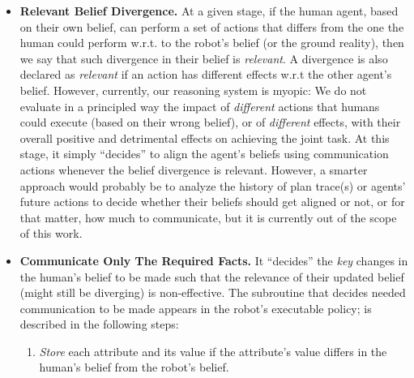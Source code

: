 \documentclass[letterpaper]{article} %
\begin{document}


\begin{itemize}
    \item \textbf{Relevant Belief Divergence.}
    At a given stage, if the human agent, based on their own belief, can perform a set of actions that differs from 
    the one 
    the human could perform w.r.t. to the robot's belief (or the ground reality), then we say that such divergence in their belief is \textit{relevant}.
    A divergence is also declared as \textit{relevant} if an action has different effects w.r.t the other agent's belief.
    However, currently, our reasoning system is myopic: We do not evaluate in a principled way the impact of \textit{different} actions that humans could execute (based on their wrong belief), or of \textit{different} effects, with their overall positive and detrimental effects on achieving the joint task. At this stage, it simply ``decides'' to align the agent's beliefs using communication actions whenever the belief divergence is relevant.
    However, a smarter approach would probably be to analyze the history of plan trace(s) or agents' future actions to decide whether their beliefs should get aligned or not, or for that matter, how much to communicate, but it is currently out of the scope of this work. 
    
    \item \textbf{Communicate Only The Required Facts.}
    It ``decides'' the \textit{key} changes in the human's belief to be made such that the relevance of their updated belief (might still be diverging) is non-effective. 
    The subroutine that decides needed 
    communication to be made appears in the robot's executable policy; is described in the following steps:
    \begin{enumerate}
        \item 
        \textit{Store} each attribute and its value if the attribute's value differs in the human's belief from the robot's belief. 
    

\end{enumerate}
\end{itemize}
\end{document}
